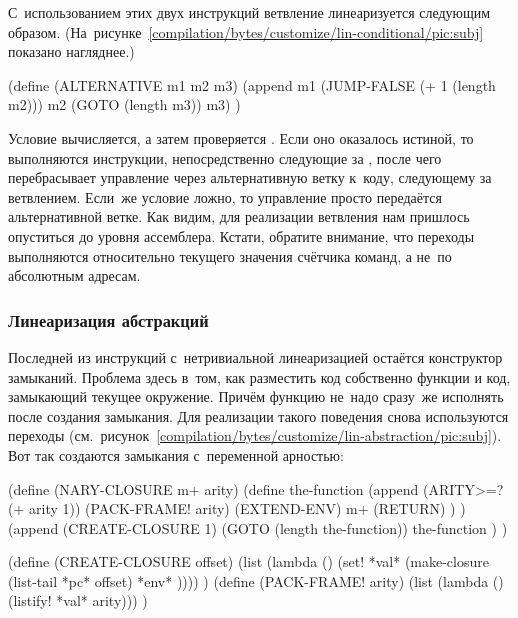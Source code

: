 С~использованием этих двух инструкций ветвление линеаризуется следующим
образом. (На~рисунке~\ref{compilation/bytes/customize/lin-conditional/pic:subj}
показано нагляднее.)

\begin{code:lisp}
(define (ALTERNATIVE m1 m2 m3)
  (append m1 (JUMP-FALSE (+ 1 (length m2))) m2 (GOTO (length m3)) m3) )
\end{code:lisp}


Условие вычисляется, а затем проверяется . Если оно оказалось
истиной, то выполняются инструкции, непосредственно следующие за
, после чего  перебрасывает управление через
альтернативную ветку к~коду, следующему за ветвлением. Если~же условие ложно,
то управление просто передаётся альтернативной ветке. Как видим, для реализации
ветвления нам пришлось опуститься до уровня ассемблера. Кстати, обратите
внимание, что переходы выполняются относительно текущего значения счётчика
команд, а не~по абсолютным адресам.


\subsubsection{Линеаризация абстракций}%
\label{compilation/bytes/customize/sssect:lin-abstraction}

Последней из инструкций с~нетривиальной линеаризацией остаётся конструктор
замыканий. Проблема здесь в~том, как разместить код собственно функции и код,
замыкающий текущее окружение. Причём функцию не~надо сразу~же исполнять после
создания замыкания. Для реализации такого поведения снова используются переходы
(см.~рисунок~\ref{compilation/bytes/customize/lin-abstraction/pic:subj}). Вот
так создаются замыкания с~переменной арностью:

\begin{code:lisp}
(define (NARY-CLOSURE m+ arity)
  (define the-function
    (append (ARITY>=? (+ arity 1)) (PACK-FRAME! arity)
            (EXTEND-ENV) m+ (RETURN) ) )
  (append (CREATE-CLOSURE 1) (GOTO (length the-function))
          the-function ) )

(define (CREATE-CLOSURE offset)
  (list (lambda () (set! *val* (make-closure (list-tail *pc* offset)
                                             *env* )))) )
(define (PACK-FRAME! arity)
  (list (lambda () (listify! *val* arity))) )
\end{code:lisp}

